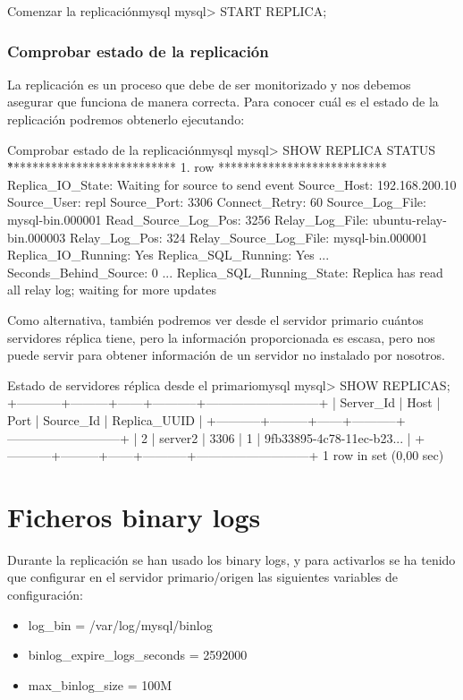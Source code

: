 \begin{mycode}{Comenzar la replicación}{mysql}{}
mysql> START REPLICA;
\end{mycode}


\subsubsection{Comprobar estado de la replicación}
La replicación es un proceso que debe de ser monitorizado y nos debemos asegurar que funciona de manera correcta. Para conocer cuál es el estado de la replicación podremos obtenerlo ejecutando:

\begin{mycode}{Comprobar estado de la replicación}{mysql}{}
mysql> SHOW REPLICA STATUS \G
*************************** 1. row ***************************
         Replica_IO_State: Waiting for source to send event
              Source_Host: 192.168.200.10
              Source_User: repl
              Source_Port: 3306
            Connect_Retry: 60
          Source_Log_File: mysql-bin.000001
      Read_Source_Log_Pos: 3256
           Relay_Log_File: ubuntu-relay-bin.000003
            Relay_Log_Pos: 324
    Relay_Source_Log_File: mysql-bin.000001
       Replica_IO_Running: Yes
      Replica_SQL_Running: Yes
...
    Seconds_Behind_Source: 0
...
Replica_SQL_Running_State: Replica has read all relay log;
waiting for more updates
\end{mycode}


Como alternativa, también podremos ver desde el servidor primario cuántos servidores réplica tiene, pero la información proporcionada es escasa, pero nos puede servir para obtener información de un servidor no instalado por nosotros.

\begin{mycode}{Estado de servidores réplica desde el primario}{mysql}{}
mysql> SHOW REPLICAS;
+-----------+---------+------+-----------+---------------------------+
| Server_Id | Host    | Port | Source_Id | Replica_UUID              |
+-----------+---------+------+-----------+---------------------------+
|         2 | server2 | 3306 |         1 | 9fb33895-4c78-11ec-b23... |
+-----------+---------+------+-----------+---------------------------+
1 row in set (0,00 sec)
\end{mycode}


\section{Ficheros binary logs}
Durante la replicación se han usado los binary logs, y para activarlos se ha tenido que configurar en el servidor primario/origen las siguientes variables de configuración:
\begin{itemize}
    \item log\_bin = /var/log/mysql/binlog
    \item binlog\_expire\_logs\_seconds = 2592000
    \item max\_binlog\_size = 100M
\end{itemize}

